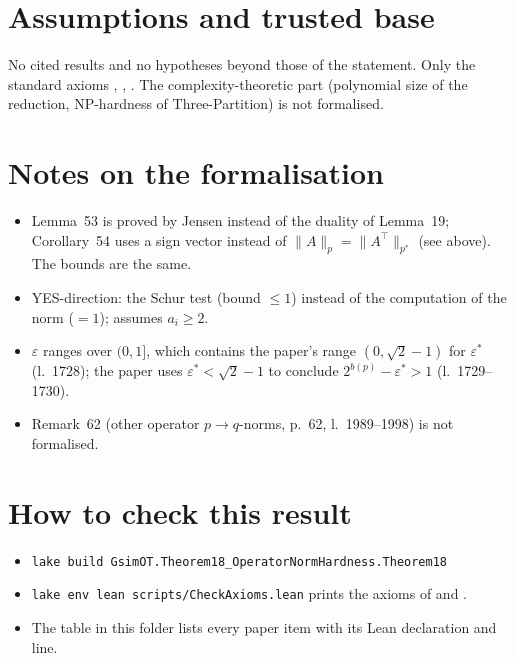 \section{Assumptions and trusted base}
No cited results and no hypotheses beyond those of the statement. Only the standard axioms ,
, . The complexity-theoretic part (polynomial size of the reduction,
NP-hardness of Three-Partition) is not formalised.

\section{Notes on the formalisation}
\begin{itemize}
\item Lemma~53 is proved by Jensen instead of the duality of Lemma~19; Corollary~54 uses a sign vector
  instead of $\|A\|_p=\|A^\top\|_{p^*}$ (see above). The bounds are the same.
\item YES-direction: the Schur test (bound $\le1$) instead of the computation of the norm ($=1$);
   assumes $a_i\ge2$.
\item $\varepsilon$ ranges over $(0,1]$, which contains the paper's range $(0,\sqrt2-1)$ for $\varepsilon^*$
  (l.~1728); the paper uses $\varepsilon^*<\sqrt2-1$ to conclude $2^{b(p)}-\varepsilon^*>1$ (l.~1729--1730).
\item Remark~62 (other operator $p\to q$-norms, p.~62, l.~1989--1998) is not formalised.
\end{itemize}

\section{How to check this result}
\begin{itemize}
\item \texttt{lake build GsimOT.Theorem18\_OperatorNormHardness.Theorem18}
\item \texttt{lake env lean scripts/CheckAxioms.lean} prints the axioms of
   and .
\item The table  in this folder lists every paper item with its Lean
  declaration and line.
\end{itemize}

